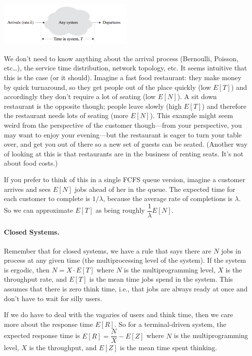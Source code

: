 \documentclass[a4paper]{report}
\begin{document}
\begin{center}
	\includegraphics[width=0.5\textwidth]{images/littleslaw.png}
\end{center}

We don't need to know anything about the arrival process (Bernoulli, Poisson, etc\ldots), the service time distribution, network topology, etc. It seems intuitive that this is the case (or it should). Imagine a fast food restaurant: they make money by quick turnaround, so they get people out of the place quickly (low $E[T]$) and accordingly they don't require a lot of seating (low $E[N]$). A sit down restaurant is the opposite though; people leave slowly (high $E[T]$) and therefore the restaurant needs lots of seating (more $E[N]$). This example might seem weird from the perspective of the customer though---from your perspective, you may want to enjoy your evening---but the restaurant is eager to turn your table over, and get you out of there so a new set of guests can be seated. (Another way of looking at this is that restaurants are in the business of renting seats. It's not about food costs.)

If you prefer to think of this in a single FCFS queue version, imagine a customer arrives and sees $E[N]$ jobs ahead of her in the queue. The expected time for each customer to complete is $1/\lambda$, because the average rate of completions is $\lambda $. So we can approximate $E[T]$ as being roughly $\dfrac{1}{\lambda}E[N]$.

\paragraph{Closed Systems.} Remember that for closed systems, we have a rule that says there are $N$ jobs in process at any given time (the multiprocessing level of the system). If the system is ergodic, then $N = X \cdot E[T]$ where $N$ is the multiprogramming level, $X$ is the throughput rate, and $E[T]$ is the mean time jobs spend in the system. This assumes that there is zero think time, i.e., that jobs are always ready at once and don't have to wait for silly users.

If we do have to deal with the vagaries of users and think time, then we care more about the response time $E[R]$. So for a terminal-driven system, the expected response time is $E[R] = \dfrac{N}{X} - E[Z]$ where $N$ is the multiprogramming level, $X$ is the throughput, and $E[Z]$ is the mean time spent thinking. 
\end{document}

